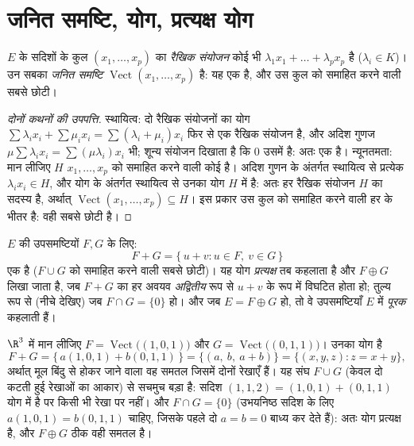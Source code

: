 \section{जनित समष्टि, योग, प्रत्यक्ष योग}

\begin{definition}[रैखिक संयोजन, जनित समष्टि]\label{def:b1:vspaces:span}
$E$ के सदिशों के कुल $(x_1, \dots, x_p)$ का \emph{रैखिक संयोजन} कोई भी
$\lambda_1 x_1 + \dots + \lambda_p x_p$ है ($\lambda_i \in K$)। उन सबका
 \emph{जनित समष्टि} $\operatorname{Vect}(x_1,
\dots, x_p)$ है: यह एक  है, और उस कुल को समाहित करने वाली सबसे छोटी।
\end{definition}

\begin{proof}[दोनों कथनों की उपपत्ति]
स्थायित्व: दो रैखिक संयोजनों का योग $\sum\lambda_i x_i + \sum\mu_i x_i =
\sum(\lambda_i + \mu_i)x_i$ फिर से एक रैखिक संयोजन है, और अदिश गुणज
$\mu\sum\lambda_i x_i = \sum(\mu\lambda_i) x_i$ भी; शून्य संयोजन दिखाता है
कि $0$ उसमें है: अतः  एक  है। न्यूनतमता: मान लीजिए $H$
$x_1, \dots, x_p$ को समाहित करने वाली कोई  है। अदिश गुणन के अंतर्गत
स्थायित्व से प्रत्येक $\lambda_i x_i \in H$, और योग के अंतर्गत स्थायित्व से
उनका योग $H$ में है: अतः हर रैखिक संयोजन $H$ का सदस्य है, अर्थात्
$\operatorname{Vect}(x_1, \dots, x_p) \subseteq H$। इस प्रकार  उस
कुल को समाहित करने वाली हर  के भीतर है: वही सबसे छोटी है।
\end{proof}

\begin{definition}[योग, प्रत्यक्ष योग]\label{def:b1:vspaces:sum}
$E$ की उपसमष्टियों $F, G$ के लिए:
\[
F + G = \{\,u + v : u \in F,\ v \in G\,\}
\]
एक  है ($F \cup G$ को समाहित करने वाली सबसे छोटी)। यह योग
\emph{प्रत्यक्ष} तब कहलाता है और $F \oplus G$ लिखा जाता
है, जब $F + G$ का हर अवयव \emph{अद्वितीय} रूप से $u + v$ के रूप में विघटित
होता हो; तुल्य रूप से (नीचे देखिए) जब $F \cap G = \{0\}$ हो। और जब $E = F
\oplus G$ हो, तो वे उपसमष्टियाँ $E$ में \emph{पूरक}
कहलाती हैं।
\end{definition}

\begin{example}[दो रेखाओं का योग]
\label{ex:b1:vspaces:sumoflines}
$\R^3$ में मान लीजिए $F = \operatorname{Vect}\bigl((1,0,1)\bigr)$ और $G =
\operatorname{Vect}\bigl((0,1,1)\bigr)$। उनका योग है
\[
F + G = \{\,a(1,0,1) + b(0,1,1)\,\}
= \{(a,\ b,\ a + b)\} = \{(x, y, z) : z = x + y\},
\]
अर्थात् मूल बिंदु से होकर जाने वाला वह समतल जिसमें दोनों रेखाएँ हैं। यह संघ
$F \cup G$ (केवल दो कटती हुई रेखाओं का आकार) से सचमुच बड़ा है: सदिश $(1, 1,
2) = (1,0,1) + (0,1,1)$ योग में है पर किसी भी रेखा पर नहीं। और $F \cap G =
\{0\}$ (उभयनिष्ठ सदिश के लिए $a(1,0,1) = b(0,1,1)$ चाहिए, जिसके पहले दो
 $a = b = 0$ बाध्य कर देते हैं): अतः योग प्रत्यक्ष है, और $F
\oplus G$ ठीक वही समतल है।
\end{example}

